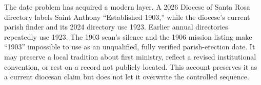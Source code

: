 The date problem has acquired a modern layer. A 2026 Diocese of Santa Rosa directory labels Saint Anthony ``Established 1903,'' while the diocese's current parish finder and its 2024 directory use 1923. Earlier annual directories repeatedly use 1923. The 1903 scan's silence and the 1906 mission listing make ``1903'' impossible to use as an unqualified, fully verified parish-erection date. It may preserve a local tradition about first ministry, reflect a revised institutional convention, or rest on a record not publicly located. This account preserves it as a current diocesan claim but does not let it overwrite the controlled sequence.

